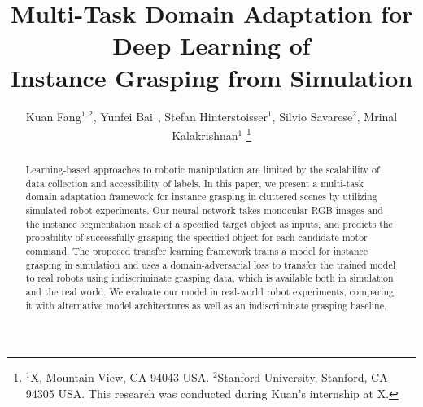 \documentclass[letterpaper, 10 pt, conference]{ieeeconf}  %
\title{\LARGE \bf
Multi-Task Domain Adaptation for Deep Learning of\\
Instance Grasping from Simulation
}
\author{Kuan Fang$^{1, 2}$, Yunfei Bai$^{1}$, Stefan Hinterstoisser$^{1}$, Silvio Savarese$^{2}$, Mrinal Kalakrishnan$^{1}$
\thanks{$^{1}$X, Mountain View, CA 94043 USA. $^{2}$Stanford University, Stanford, CA 94305 USA. This research was conducted during Kuan's internship at X.}}
\begin{document}
\maketitle
\thispagestyle{empty}
\pagestyle{empty}


\begin{abstract}

Learning-based approaches to robotic manipulation are limited by the scalability of data collection and accessibility of labels. In this paper, we present a multi-task domain adaptation framework for instance grasping in cluttered scenes by utilizing simulated robot experiments. Our neural network takes monocular RGB images and the instance segmentation mask of a specified target object as inputs, and predicts the probability of successfully grasping the specified object for each candidate motor command. The proposed transfer learning framework trains a model for instance grasping in simulation and uses a domain-adversarial loss to transfer the trained model to real robots using indiscriminate grasping data, which is available both in simulation and the real world. We evaluate our model in real-world robot experiments, comparing it with alternative model architectures as well as an indiscriminate grasping baseline.

\end{abstract}


\end{document}
